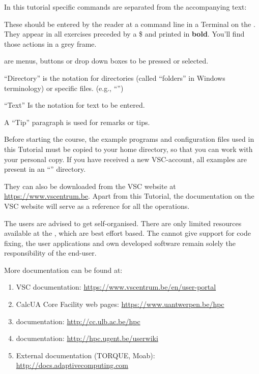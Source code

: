 
In this tutorial specific commands are separated from the accompanying text:

\begin{prompt}
\end{prompt}

These should be entered by the reader at a command line in a Terminal on the \hpcInfra. They appear in all exercises preceded by a \$ and printed in \textbf{bold}. You'll find those actions in a grey frame.

 are menus, buttons or drop down boxes to be pressed or selected.

``Directory'' is the notation for directories (called ``folders'' in
Windows terminology) or specific files. (e.g., ``\homedir'')

``Text'' Is the notation for text to be entered.

\begin{tip}
A ``Tip'' paragraph is used for remarks or tips.
\end{tip}


Before starting the course, the example programs and configuration files used in this Tutorial must be copied to your home directory, so that you can work with your personal copy. If you have received a new VSC-account, all examples are present in an ``\examplesdir'' directory.

\begin{prompt}
\end{prompt}

They can also be downloaded from the VSC website at
\url{https://www.vscentrum.be}.
Apart from this \hpc Tutorial, the documentation on the VSC website
will serve as a reference for all the
operations.


\begin{tip}
The users are advised to get self-organised. There are
only limited resources available at the \hpc, which are best effort based.
The \hpc cannot give support for code fixing, the user applications and own
developed software remain solely the responsibility of the end-user.
\end{tip}

More documentation can be found at:

\begin{enumerate}
  \item  VSC documentation: \url{https://www.vscentrum.be/en/user-portal}
  \ifantwerpen
    \item CalcUA Core Facility web pages: \url{https://www.uantwerpen.be/hpc}
  \fi
  \ifbrussel
    \item \hpcname documentation: \url{http://cc.ulb.ac.be/hpc}
  \fi
  \ifgent
    \item \hpcname documentation: \url{http://hpc.ugent.be/userwiki}
  \fi
  \item  External documentation (TORQUE, Moab): \url{http://docs.adaptivecomputing.com}
\end{enumerate}

